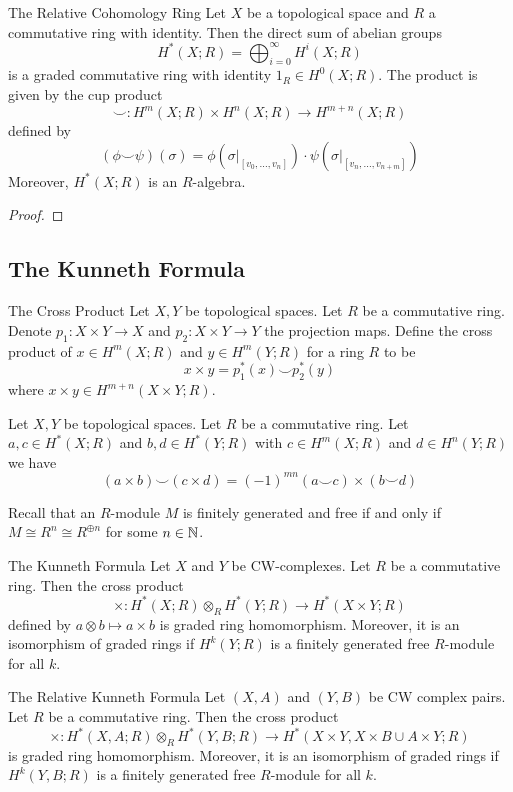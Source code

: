 \documentclass[a4paper]{article}
\begin{document}
\begin{thm}{The Relative Cohomology Ring}{} Let $X$ be a topological space and $R$ a commutative ring with identity. Then the direct sum of abelian groups $$H^\ast(X;R)=\bigoplus_{i=0}^\infty H^i(X;R)$$ is a graded commutative ring with identity $1_R\in H^0(X;R)$. The product is given by the cup product $$\smile:H^m(X;R)\times H^n(X;R)\to H^{m+n}(X;R)$$ defined by $$(\phi\smile\psi)(\sigma)=\phi(\sigma|_{[v_0,\dots,v_n]})\cdot\psi(\sigma|_{[v_n,\dots,v_{n+m}]})$$ Moreover, $H^\ast(X;R)$ is an $R$-algebra. \tcbline
\begin{proof}
\end{proof}
\end{thm}

\subsection{The Kunneth Formula}
\begin{defn}{The Cross Product}{} Let $X,Y$ be topological spaces. Let $R$ be a commutative ring. Denote $p_1:X\times Y\to X$ and $p_2:X\times Y\to Y$ the projection maps. Define the cross product of $x\in H^m(X;R)$ and $y\in H^m(Y;R)$ for a ring $R$ to be $$x\times y=p_1^\ast(x)\smile p_2^\ast(y)$$ where $x\times y\in H^{m+n}(X\times Y;R)$. 
\end{defn}

\begin{prp}{}{} Let $X,Y$ be topological spaces. Let $R$ be a commutative ring. Let $a,c\in H^\ast(X;R)$ and $b,d\in H^\ast(Y;R)$ with $c\in H^m(X;R)$ and $d\in H^n(Y;R)$ we have $$(a\times b)\smile(c\times d)=(-1)^{mn}(a\smile c)\times(b\smile d)$$
\end{prp}

Recall that an $R$-module $M$ is finitely generated and free if and only if $M\cong R^n\cong R^{\oplus n}$ for some $n\in\mathbb{N}$. 

\begin{thm}{The Kunneth Formula}{} Let $X$ and $Y$ be CW-complexes. Let $R$ be a commutative ring. Then the cross product $$\times:H^\ast(X;R)\otimes_R H^\ast(Y;R)\to H^\ast(X\times Y;R)$$ defined by $a\otimes b\mapsto a\times b$ is graded ring homomorphism. Moreover, it is an isomorphism of graded rings if $H^k(Y;R)$ is a finitely generated free $R$-module for all $k$. 
\end{thm}

\begin{thm}{The Relative Kunneth Formula}{} Let $(X,A)$ and $(Y,B)$ be CW complex pairs. Let $R$ be a commutative ring. Then the cross product $$\times:H^\ast(X,A;R)\otimes_R H^\ast(Y,B;R)\to H^\ast(X\times Y,X\times B\cup A\times Y;R)$$ is graded ring homomorphism. Moreover, it is an isomorphism of graded rings if $H^k(Y,B;R)$ is a finitely generated free $R$-module for all $k$. 
\end{thm}
\end{document}
